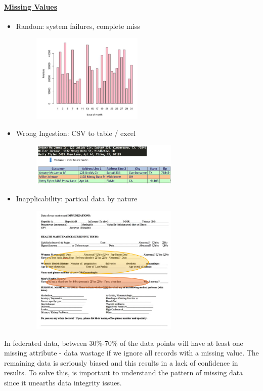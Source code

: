\documentclass[10pt,a4paper]{article}
\begin{document}
\paragraph{\uline{Missing Values}}
\begin{itemize}
	\item Random: system failures, complete miss
	\begin{figure}[ht!]
 \hfill \includegraphics[width=150pt]{images/missing-data-failure}
 \hspace*{\fill}
 \end{figure} 
 \pagebreak
	\item Wrong Ingestion: CSV to table / excel
	\begin{figure}[ht!]
 \hfill \includegraphics[width=200pt]{images/missing-data-ingestion}
 \hspace*{\fill}
 \end{figure} 
	\item Inapplicability: partical data by nature
	\begin{figure}[ht!]
 \hfill \includegraphics[width=200pt]{images/missing-data-inapplicability}
 \hspace*{\fill}
 \end{figure} 
\end{itemize}
In federated data, between 30\%-70\% of the data points will have at least one missing attribute - data wastage if we ignore all records with a missing value. The remaining data is seriously biased and this results in a lack of confidence in results. To solve this, is important to understand the pattern of missing data since it unearths data integrity issues.
\end{document}
